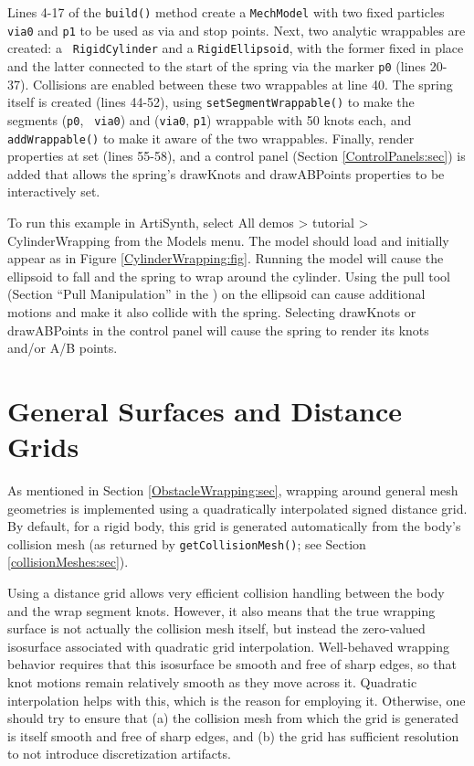 Lines 4-17 of the {\tt build()} method create a {\tt MechModel} with
two fixed particles {\tt via0} and {\tt p1} to be used as via and stop
points. Next, two analytic wrappables are created: a {\tt
RigidCylinder} and a {\tt RigidEllipsoid}, with the former fixed in
place and the latter connected to the start of the spring via the
marker {\tt p0} (lines 20-37). Collisions are enabled between these
two wrappables at line 40. The spring itself is created (lines 44-52),
using {\tt setSegmentWrappable()} to make the segments ({\tt p0}, {\tt
via0}) and ({\tt via0}, {\tt p1}) wrappable with 50 knots each, and
{\tt addWrappable()} to make it aware of the two wrappables.  Finally,
render properties at set (lines 55-58), and a control panel (Section
\ref{ControlPanels:sec}) is added that allows the spring's {\sf
drawKnots} and {\sf drawABPoints} properties to be interactively set.

To run this example in ArtiSynth, select {\sf All demos > tutorial >
CylinderWrapping} from the {\sf Models} menu. The model should load and
initially appear as in Figure \ref{CylinderWrapping:fig}.  Running the
model will cause the ellipsoid to fall and the spring to wrap around
the cylinder. Using the pull tool
(Section ``Pull Manipulation'' in the
)
on the ellipsoid can cause additional motions and make it also collide
with the spring. Selecting {\sf drawKnots} or {\sf drawABPoints} in
the control panel will cause the spring to render its knots and/or A/B
points.

\section{General Surfaces and Distance Grids}
\label{GeneralSurfaceWrapping:sec}

As mentioned in Section \ref{ObstacleWrapping:sec}, wrapping around
general mesh geometries is implemented using a quadratically
interpolated signed distance grid. By default, for a rigid body, this
grid is generated automatically from the body's collision mesh (as
returned by {\tt getCollisionMesh()}; see Section
\ref{collisionMeshes:sec}).

Using a distance grid allows very efficient collision handling between
the body and the wrap segment knots. However, it also means that the
true wrapping surface is not actually the collision mesh itself, but
instead the zero-valued isosurface associated with quadratic grid
interpolation.  Well-behaved wrapping behavior requires that this
isosurface be smooth and free of sharp edges, so that knot motions
remain relatively smooth as they move across it. Quadratic
interpolation helps with this, which is the reason for employing
it. Otherwise, one should try to ensure that (a) the collision mesh
from which the grid is generated is itself smooth and free of sharp
edges, and (b) the grid has sufficient resolution to not introduce
discretization artifacts.

